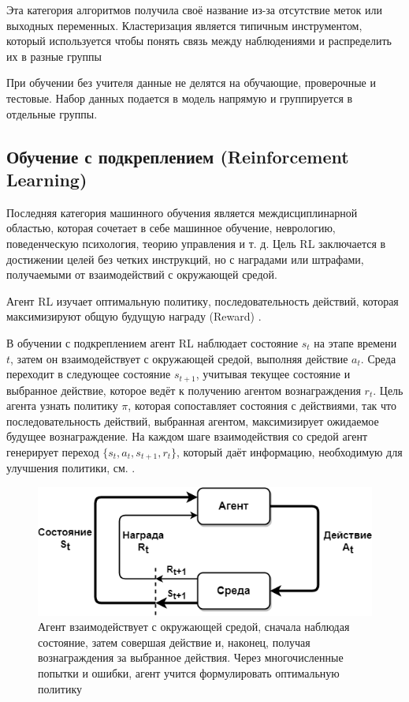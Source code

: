 Эта категория алгоритмов получила своё название из-за отсутствие меток или выходных переменных. Кластеризация является типичным инструментом, который используется чтобы понять связь между наблюдениями и распределить их в разные группы \cite{hastie2001elements}

При обучении без учителя данные не делятся на обучающие, проверочные и тестовые. Набор данных подается в модель напрямую и группируется в отдельные группы.


\subsection{Обучение с подкреплением (Reinforcement Learning)}

Последняя категория машинного обучения является междисциплинарной областью, которая сочетает в себе машинное обучение, неврологию, поведенческую психология, теорию управления и т. д. Цель RL заключается в достижении целей без четких инструкций, но с наградами или штрафами, получаемыми от взаимодействий с окружающей средой. 

Агент RL изучает оптимальную политику, последовательность действий, которая максимизируют общую будущую награду (Reward) \cite{SuttonAndBarto-RL-Introduction-p2}.

В обучении с подкреплением агент RL наблюдает состояние ${s_t}$ на этапе времени ${t}$, затем он взаимодействует с окружающей средой, выполняя действие ${a_t}$. Среда переходит в следующее состояние ${s_{t+1}}$, учитывая текущее состояние и выбранное действие, которое ведёт к получению агентом вознаграждения ${r_t}$. Цель агента узнать политику $\pi$, которая сопоставляет состояния с действиями, так что последовательность действий, выбранная агентом, максимизирует ожидаемое будущее вознаграждение. На каждом шаге взаимодействия со средой агент генерирует переход ${\{s_t, a_t, s_{t+1}, r_t\}}$, который даёт информацию, необходимую для улучшения политики, см. .

\begin{figure}[ht!] 
	\center
	\includegraphics [scale=0.60] {my_folder/images/ch1/rl-flow.png}
	\caption{Агент взаимодействует с окружающей средой, сначала наблюдая состояние, затем совершая действие и, наконец, получая вознаграждения за выбранное действия. Через многочисленные попытки и ошибки, агент учится формулировать оптимальную политику \cite{SuttonAndBarto-RL-Introduction-p50}} 
	\label{fig:ch1-RL-flow}
\end{figure}
